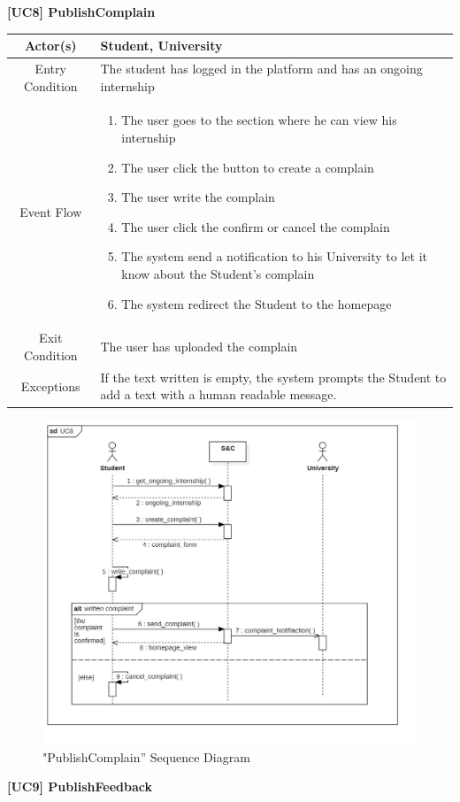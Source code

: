 \documentclass{article}
\begin{document}
\vspace{1cm}
\textbf{[UC8] PublishComplain}

\begin{table}[H]
    \centering
    \begin{tabular}{|c|p{10cm}|}
    \hline
        Actor(s)  & Student, University\\ 
    \hline
        Entry Condition &  
        The student has logged in the platform and has an ongoing internship\\
    \hline
        Event Flow &
        \begin{enumerate}
            \item The user goes to the section where he can view his internship
            \item The user click the button to create a complain
            \item The user write the complain
            \item The user click the confirm or cancel the complain
            \item The system send a notification to his University to let it know about the Student's complain
            \item The system redirect the Student to the homepage
        \end{enumerate}
        \\
    \hline
        Exit Condition & The user has uploaded the complain\\
    \hline
        Exceptions &  If the text written is empty, the system prompts the Student to add a text with a human readable message.\\
    \hline
    \end{tabular}
    \label{tab:my_label}
\end{table}
\begin{figure}[H]
    \centering
    \includegraphics[width=1\linewidth]{sequenceDiagrams/UC8.jpg}
    \caption{"PublishComplain” Sequence Diagram}
    \label{fig:enter-label}
\end{figure}
\vspace{1cm}
\textbf{[UC9] PublishFeedback}
\end{document}
